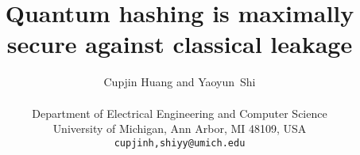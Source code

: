 \documentclass[11pt]{article}
\title{Quantum hashing is maximally secure against classical leakage}
\author{%
   Cupjin Huang and Yaoyun~Shi  \\
 \\
  Department of Electrical Engineering and Computer Science\\
  University of Michigan, Ann Arbor, MI 48109, USA\\
  \texttt{{cupjinh,shiyy@umich.edu}}
}
\date{}
\numberwithin{theorem}{section}
\numberwithin{equation}{section}
\begin{document}
\maketitle
\thispagestyle{empty}

\begin{abstract}

\end{abstract}

\clearpage
\setcounter{page}{1}



\newpage

\newpage


\end{document}

